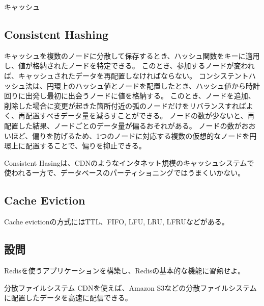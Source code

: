 \documentclass{jlreq}
\begin{document}
\begin{section-bib}{キャッシュ}
  \subsection{Consistent Hashing}
  キャッシュを複数のノードに分散して保存するとき、ハッシュ関数をキーに適用し、値が格納されたノードを特定できる。
  このとき、参加するノードが変われば、キャッシュされたデータを再配置しなければならない。
  コンシステントハッシュ法は、円環上のハッシュ値とノードを配置したとき、ハッシュ値から時計回りに出発し最初に出会うノードに値を格納する\cite{sdi}。
  このとき、ノードを追加、削除した場合に変更が起きた箇所付近の弧のノードだけをリバランスすればよく、再配置すべきデータ量を減らすことができる。
  ノードの数が少ないと、再配置した結果、ノードごとのデータ量が偏るおそれがある。
  ノードの数がおおいほど、偏りを防げるため、1つのノードに対応する複数の仮想的なノードを円環上に配置することで、偏りを抑止できる。
  
  Consistent Hasingは、CDNのようなインタネット規模のキャッシュシステムで使われる一方で、データベースのパーティショニングではうまくいかない\cite{DBLP:journals/corr/LampingV14}。
  \subsection{Cache Eviction}
  Cache evictionの方式にはTTL、FIFO, LFU, LRU, LFRUなどがある\cite{lc-cache}。
  \subsection{設問}
  \begin{exercise}
  \item Redisを使うアプリケーションを構築し、Redisの基本的な機能に習熟せよ。
  \end{exercise}
\end{section-bib}
\begin{section-bib}{分散ファイルシステム}
  CDNを使えば、Amazon S3などの分散ファイルシステムに配置したデータを高速に配信できる\cite{lc-databases}。
\end{section-bib}
\end{document}
